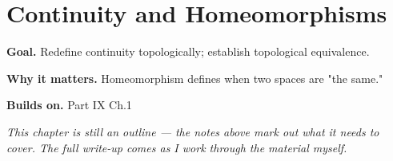 \chapter{Continuity and Homeomorphisms}
\label{ch:09-topology-02}

\begin{chapterintro}
\textbf{Goal.} Redefine continuity topologically; establish topological equivalence.

\textbf{Why it matters.} Homeomorphism defines when two spaces are "the same."

\textbf{Builds on.} Part IX Ch.1
\end{chapterintro}

\textit{This chapter is still an outline --- the notes above mark out what it needs to cover. The full write-up comes as I work through the material myself.}
